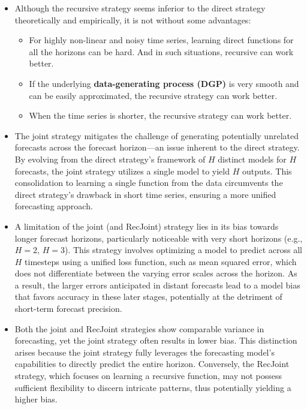 \documentclass{article}
\begin{document}
\begin{itemize}
    \item Although the recursive strategy seems inferior to the direct strategy theoretically and empirically, it is not without some advantages:
    \begin{itemize}
        \item For highly non-linear and noisy time series, learning direct functions for all the horizons can be hard. And in such situations, recursive can work better.
        \item If the underlying \textbf{data-generating process (DGP)} is very smooth and can be easily approximated, the recursive strategy can work better.
        \item When the time series is shorter, the recursive strategy can work better.
    \end{itemize}
    \item The joint strategy mitigates the challenge of generating potentially unrelated forecasts across the forecast horizon—an issue inherent to the direct strategy. By evolving from the direct strategy's framework of \(H\) distinct models for \(H\) forecasts, the joint strategy utilizes a single model to yield \(H\) outputs. This consolidation to learning a single function from the data circumvents the direct strategy's drawback in short time series, ensuring a more unified forecasting approach.
    \item A limitation of the joint (and RecJoint) strategy lies in its bias towards longer forecast horizons, particularly noticeable with very short horizons (e.g., \(H = 2\), \(H = 3\)). This strategy involves optimizing a model to predict across all \(H\) timesteps using a unified loss function, such as mean squared error, which does not differentiate between the varying error scales across the horizon. As a result, the larger errors anticipated in distant forecasts lead to a model bias that favors accuracy in these later stages, potentially at the detriment of short-term forecast precision.
    \item Both the joint and RecJoint strategies show comparable variance in forecasting, yet the joint strategy often results in lower bias. This distinction arises because the joint strategy fully leverages the forecasting model's capabilities to directly predict the entire horizon. Conversely, the RecJoint strategy, which focuses on learning a recursive function, may not possess sufficient flexibility to discern intricate patterns, thus potentially yielding a higher bias.
\end{itemize}
\end{document}
